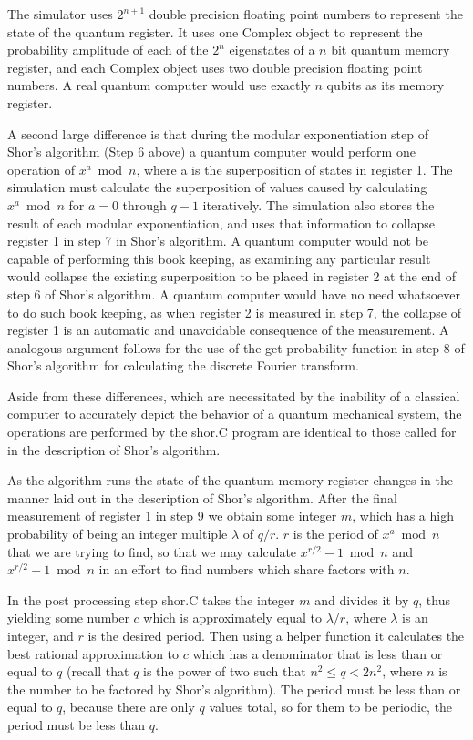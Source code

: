 \documentclass[]{article}
\begin{document}
The simulator uses $2^{n+1}$ double precision floating point numbers
to represent the state of the quantum register. It uses one Complex
object to represent the probability amplitude of each of the $2^{n}$
eigenstates of a $n$ bit quantum memory register, and each Complex
object uses two double precision floating point numbers. A real
quantum computer would use exactly $n$ qubits as its memory register.

A second large difference is that during the modular exponentiation
step of Shor's algorithm (Step 6 above) a quantum computer would
perform one operation of $x^{a} \bmod n$, where a is the superposition
of states in register 1. The simulation must calculate the
superposition of values caused by calculating $x^{a} \bmod n$ for $a =
0$ through $q - 1$ iteratively. The simulation also stores the result
of each modular exponentiation, and uses that information to collapse
register 1 in step 7 in Shor's algorithm. A quantum computer would not
be capable of performing this book keeping, as examining any
particular result would collapse the existing superposition to be
placed in register 2 at the end of step 6 of Shor's algorithm. A
quantum computer would have no need whatsoever to do such book
keeping, as when register 2 is measured in step 7, the collapse of
register 1 is an automatic and unavoidable consequence of the
measurement. A analogous argument follows for the use of the get
probability function in step 8 of Shor's algorithm for calculating the
discrete Fourier transform.

Aside from these differences, which are necessitated by the inability
of a classical computer to accurately depict the behavior of a quantum
mechanical system, the operations are performed by the shor.C program
are identical to those called for in the description of Shor's
algorithm.

As the algorithm runs the state of the quantum memory register changes
in the manner laid out in the description of Shor's algorithm.  After
the final measurement of register 1 in step 9 we obtain some integer
$m$, which has a high probability of being an integer multiple
$\lambda$ of $q / r$. $r$ is the period of $x^{a} \bmod n$ that we are
trying to find, so that we may calculate $x^{r/2} - 1 \bmod n$ and
$x^{r/2} + 1 \bmod n$ in an effort to find numbers which share factors
with $n$.

In the post processing step shor.C takes the integer $m$ and divides
it by $q$, thus yielding some number $c$ which is approximately equal
to $\lambda / r$, where $\lambda$ is an integer, and $r$ is the
desired period. Then using a helper function it calculates the best
rational approximation to $c$ which has a denominator that is less
than or equal to $q$ (recall that $q$ is the power of two such that
$n^{2} \leq q < 2n^{2}$, where $n$ is the number to be factored by
Shor's algorithm).  The period must be less than or equal to $q$,
because there are only $q$ values total, so for them to be periodic, the
period must be less than $q$.
\end{document}
